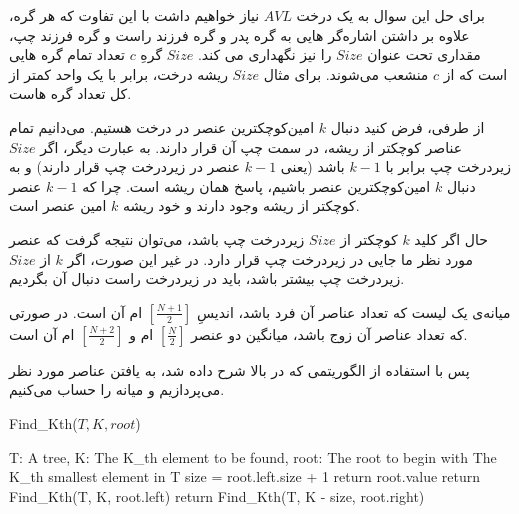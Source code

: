 \documentclass[]{article}
\begin{document}
برای حل این سوال به یک درخت
$AVL$
نیاز خواهیم داشت
با این تفاوت که هر گره، علاوه بر داشتن اشاره‌گر هایی به گره پدر
و گره فرزند راست و گره فرزند چپ،
مقداری تحت عنوان
$Size$
را نیز نگهداری می کند.
$Size$
گرهِ
$c$
تعداد تمام گره هایی است که از 
$c$
منشعب می‌شوند.
برای مثال
$Size$
ریشه درخت،
برابر با یک واحد کمتر از کل تعداد گره هاست.


از طرفی، فرض کنید دنبال
$k$
امین‌کوچکترین عنصر در درخت هستیم.
می‌دانیم تمام عناصر کوچکتر
از ریشه، در سمت چپ آن قرار دارند. به عبارت دیگر، اگر
$Size$
زیردرخت چپ برابر با
$k - 1$
باشد (یعنی
$k - 1$
عنصر در زیردرخت چپ قرار دارند)
و به دنبال
$k$
امین‌کوچکترین عنصر باشیم،
پاسخ همان ریشه است. چرا که
$k - 1$
عنصر کوچکتر از ریشه وجود دارند و خود ریشه
$k$
امین عنصر است.

حال اگر کلید
$k$
کوچکتر از
$Size$
زیردرخت چپ باشد، می‌توان نتیجه گرفت که عنصر مورد نظر ما
جایی در زیردرخت چپ قرار دارد.
در غیر این صورت، اگر
$k$
از
$Size$
زیردرخت چپ بیشتر باشد، باید در زیردرخت راست دنبال آن بگردیم.

میانه‌ی یک لیست که تعداد عناصر آن فرد باشد، اندیسِ
$\left[\frac{N + 1}{2}\right]$
ام آن است.
در صورتی که تعداد عناصر آن زوج باشد، میانگین دو عنصر
$\left[\frac{N}{2}\right]$
ام و 
$\left[\frac{N + 2}{2}\right]$
ام آن است.

پس با استفاده از الگوریتمی که در بالا شرح داده شد،
به یافتن عناصر مورد نظر می‌پردازیم و میانه را حساب می‌کنیم.

\begin{latin}
    \begin{algorithm}[H]
        \caption*{Find\_Kth($T, K, root$)}
        \begin{algorithmic}
            \Require T: A tree, K: The K\_th element to be found, root: The root to begin with
            \Ensure The K\_th smallest element in T 
            \State size = root.left.size + 1
                \State return root.value
                \State return Find\_Kth(T, K, root.left)
            \Else
                \State return Find\_Kth(T, K - size, root.right)
            \EndIf
        \end{algorithmic}
    \end{algorithm}
\end{latin}
\end{document}

